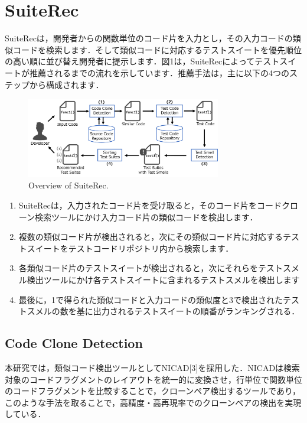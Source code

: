 \documentclass[conference]{IEEEtran}
\begin{document}
\section{SuiteRec}
SuiteRecは，開発者からの関数単位のコード片を入力とし，その入力コードの類似コードを検索します．そして類似コードに対応するテストスイートを優先順位の高い順に並び替え開発者に提示します．図1は，SuiteRecによってテストスイートが推薦されるまでの流れを示しています．推薦手法は，主に以下の4つのステップから構成されます．

\begin{figure}[htbp]
\centerline{\includegraphics[width=8.5cm]{SuiteRec-outline.pdf}}
\caption{Overview of SuiteRec.}
\label{fig}
\end{figure}

\begin{enumerate}
\renewcommand{\labelenumi}{(\arabic{enumi})}
\item SuiteRecは，入力されたコード片を受け取ると，そのコード片をコードクローン検索ツールにかけ入力コード片の類似コードを検出します．
\item 複数の類似コード片が検出されると，次にその類似コード片に対応するテストスイートをテストコードリポジトリ内から検索します．
\item 各類似コード片のテストスイートが検出されると，次にそれらをテストスメル検出ツールにかけ各テストスイートに含まれるテストスメルを検出します
\item 最後に，1で得られた類似コードと入力コードの類似度と3で検出されたテストスメルの数を基に出力されるテストスイートの順番がランキングされる．
\end{enumerate}


\subsection{Code Clone Detection}
本研究では，類似コード検出ツールとしてNICAD[3]を採用した．NICADは検索対象のコードフラグメントのレイアウトを統一的に変換させ，行単位で関数単位のコードフラグメントを比較することで，クローンペア検出するツールであり，このような手法を取ることで，高精度・高再現率でのクローンペアの検出を実現している．
\end{document}
